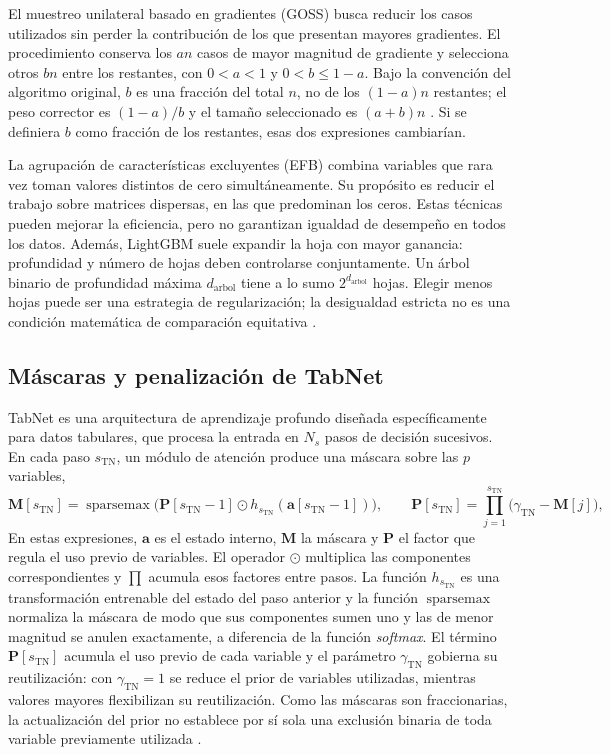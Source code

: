 El muestreo unilateral basado en gradientes (GOSS) busca reducir los casos utilizados sin perder la contribución de los que presentan mayores gradientes. El procedimiento conserva los $an$ casos de mayor magnitud de gradiente y selecciona otros $bn$ entre los restantes, con $0<a<1$ y $0<b\leq1-a$. Bajo la convención del algoritmo original, $b$ es una fracción del total $n$, no de los $(1-a)n$ restantes; el peso corrector es $(1-a)/b$ y el tamaño seleccionado es $(a+b)n$ \cite{ke2017}. Si se definiera $b$ como fracción de los restantes, esas dos expresiones cambiarían.

La agrupación de características excluyentes (EFB) combina variables que rara vez toman valores distintos de cero simultáneamente. Su propósito es reducir el trabajo sobre matrices dispersas, en las que predominan los ceros. Estas técnicas pueden mejorar la eficiencia, pero no garantizan igualdad de desempeño en todos los datos. Además, LightGBM suele expandir la hoja con mayor ganancia: profundidad y número de hojas deben controlarse conjuntamente. Un árbol binario de profundidad máxima $d_{\mathrm{arbol}}$ tiene a lo sumo $2^{d_{\mathrm{arbol}}}$ hojas. Elegir menos hojas puede ser una estrategia de regularización; la desigualdad estricta no es una condición matemática de comparación equitativa \cite{revlighttuning}.


\subsection{Máscaras y penalización de TabNet}\label{clara:tabnet}
TabNet es una arquitectura de aprendizaje profundo diseñada específicamente para datos tabulares, que procesa la entrada en $N_{s}$ pasos de decisión sucesivos. En cada paso $s_{\mathrm{TN}}$, un módulo de atención produce una máscara sobre las $p$ variables,
\[
\mathbf{M}[s_{\mathrm{TN}}]=\operatorname{sparsemax}\big(\mathbf{P}[s_{\mathrm{TN}}-1]\odot h_{s_{\mathrm{TN}}}(\mathbf{a}[s_{\mathrm{TN}}-1])\big),
\qquad
\mathbf{P}[s_{\mathrm{TN}}]=\prod_{j=1}^{s_{\mathrm{TN}}}\big(\gamma_{\mathrm{TN}}-\mathbf{M}[j]\big),
\]
En estas expresiones, $\mathbf a$ es el estado interno, $\mathbf M$ la máscara y $\mathbf P$ el factor que regula el uso previo de variables. El operador $\odot$ multiplica las componentes correspondientes y $\prod$ acumula esos factores entre pasos. La función $h_{s_{\mathrm{TN}}}$ es una transformación entrenable del estado del paso anterior y la función $\operatorname{sparsemax}$ normaliza la máscara de modo que sus componentes sumen uno y las de menor magnitud se anulen exactamente, a diferencia de la función \textit{softmax}. El término $\mathbf{P}[s_{\mathrm{TN}}]$ acumula el uso previo de cada variable y el parámetro $\gamma_{\mathrm{TN}}$ gobierna su reutilización: con $\gamma_{\mathrm{TN}}=1$ se reduce el prior de variables utilizadas, mientras valores mayores flexibilizan su reutilización. Como las máscaras son fraccionarias, la actualización del prior no establece por sí sola una exclusión binaria de toda variable previamente utilizada \cite{arXiv190807442}. 

